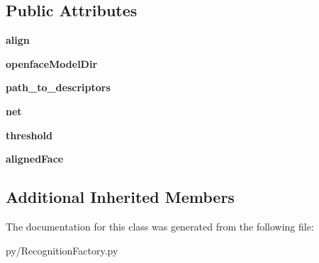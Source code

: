 \subsection*{Public Attributes}
\begin{DoxyCompactItemize}
\item 
{\bfseries align}\hypertarget{classRecognitionFactory_1_1OpenFace_a1c901bdf709de3d7e1b40093af926974}{}\label{classRecognitionFactory_1_1OpenFace_a1c901bdf709de3d7e1b40093af926974}

\item 
{\bfseries openface\+Model\+Dir}\hypertarget{classRecognitionFactory_1_1OpenFace_a1ee73330a23fce8a6ca41231d778ec91}{}\label{classRecognitionFactory_1_1OpenFace_a1ee73330a23fce8a6ca41231d778ec91}

\item 
{\bfseries path\+\_\+to\+\_\+descriptors}\hypertarget{classRecognitionFactory_1_1OpenFace_acaa350f52e5e1a71b2d6643403ec1af1}{}\label{classRecognitionFactory_1_1OpenFace_acaa350f52e5e1a71b2d6643403ec1af1}

\item 
{\bfseries net}\hypertarget{classRecognitionFactory_1_1OpenFace_a4cd893ba8a2c3882481901c1093c3ae3}{}\label{classRecognitionFactory_1_1OpenFace_a4cd893ba8a2c3882481901c1093c3ae3}

\item 
{\bfseries threshold}\hypertarget{classRecognitionFactory_1_1OpenFace_a334cc50444b6906a8c08ec658c8f5438}{}\label{classRecognitionFactory_1_1OpenFace_a334cc50444b6906a8c08ec658c8f5438}

\item 
{\bfseries aligned\+Face}\hypertarget{classRecognitionFactory_1_1OpenFace_a1acaa386b19695644e18eab416f390ee}{}\label{classRecognitionFactory_1_1OpenFace_a1acaa386b19695644e18eab416f390ee}

\end{DoxyCompactItemize}
\subsection*{Additional Inherited Members}


The documentation for this class was generated from the following file\+:\begin{DoxyCompactItemize}
\item 
py/Recognition\+Factory.\+py\end{DoxyCompactItemize}
